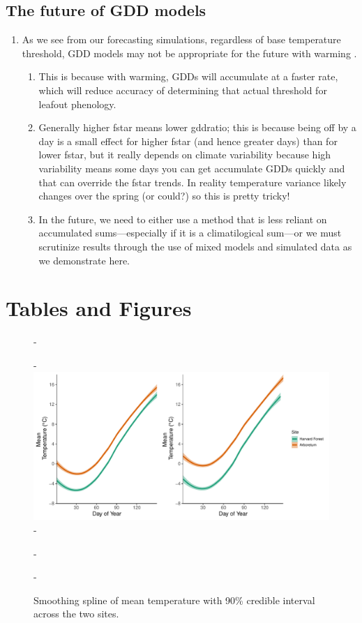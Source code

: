 \documentclass{article}\usepackage[]{graphicx}\usepackage[]{color}
\begin{document}
\subsection*{The future of GDD models}
\begin{enumerate}
\item As we see from our forecasting simulations, regardless of base temperature threshold, GDD models may not be appropriate for the future with warming \citep{Man2010}. 
  \begin{enumerate}
  \item This is because with warming, GDDs will accumulate at a faster rate, which will reduce accuracy of determining that actual threshold for leafout phenology. 
  \item Generally higher fstar means lower gddratio; this is because being off by a day is a small effect for higher fstar (and hence greater days) than for lower fstar, but it really depends on climate variability because high variability means some days you can get accumulate GDDs quickly and that can override the fstar trends. In reality temperature variance likely changes over the spring (or could?) so this is pretty tricky! 
  \item In the future, we need to either use a method that is less reliant on accumulated sums---especially if it is a climatilogical sum---or we must scrutinize results through the use of mixed models and simulated data as we demonstrate here. 
  \end{enumerate}
\end{enumerate}






\section*{Tables and Figures}
  
{\begin{figure} [H]
  -\begin{center}
  -\includegraphics[width=12cm]{..//analyses/figures/climate_hfandts.pdf}
  -\caption{Smoothing spline of mean temperature with 90\% credible interval across the two sites.}\label{fig:clim}
  -\end{center}
  -\end{figure}}
  
\end{document}
